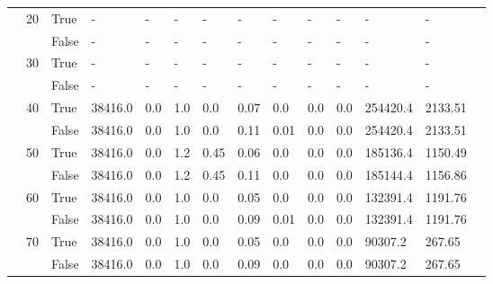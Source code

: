 \begin{appendices}
\begin{landscape}
\begin{small}
\begin{longtable}[c]{@{}lll|ll|ll|ll|ll|lll@{}}
   & 20 & True  & -               & -              & -             & -             & -             & -             & -             & -             & -             & -           &  \\
   &    & False & -               & -              & -             & -             & -             & -             & -             & -             & -             & -           &  \\
   & 30 & True  & -               & -              & -             & -             & -             & -             & -             & -             & -             & -           &  \\
   &    & False & -               & -              & -             & -             & -             & -             & -             & -             & -             & -           &  \\
   & 40 & True  & 38416.0         & 0.0            & 1.0           & 0.0           & 0.07          & 0.0           & 0.0           & 0.0           & 254420.4      & 2133.51     &  \\
   &    & False & 38416.0         & 0.0            & 1.0           & 0.0           & 0.11          & 0.01          & 0.0           & 0.0           & 254420.4      & 2133.51     &  \\
   & 50 & True  & 38416.0         & 0.0            & 1.2           & 0.45          & 0.06          & 0.0           & 0.0           & 0.0           & 185136.4      & 1150.49     &  \\
   &    & False & 38416.0         & 0.0            & 1.2           & 0.45          & 0.11          & 0.0           & 0.0           & 0.0           & 185144.4      & 1156.86     &  \\
   & 60 & True  & 38416.0         & 0.0            & 1.0           & 0.0           & 0.05          & 0.0           & 0.0           & 0.0           & 132391.4      & 1191.76     &  \\
   &    & False & 38416.0         & 0.0            & 1.0           & 0.0           & 0.09          & 0.01          & 0.0           & 0.0           & 132391.4      & 1191.76     &  \\
   & 70 & True  & 38416.0         & 0.0            & 1.0           & 0.0           & 0.05          & 0.0           & 0.0           & 0.0           & 90307.2       & 267.65      &  \\
   &    & False & 38416.0         & 0.0            & 1.0           & 0.0           & 0.09          & 0.0           & 0.0           & 0.0           & 90307.2       & 267.65      &  \\

\end{longtable}
\end{small}
\end{landscape}
\end{appendices}
